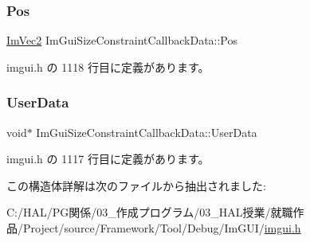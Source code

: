 \subsubsection{\texorpdfstring{Pos}{Pos}}
{\footnotesize\ttfamily \mbox{\hyperlink{struct_im_vec2}{Im\+Vec2}} Im\+Gui\+Size\+Constraint\+Callback\+Data\+::\+Pos}



 imgui.\+h の 1118 行目に定義があります。

\mbox{\label{struct_im_gui_size_constraint_callback_data_a3b2fb1bd849f82edc78377f361433eac}} 
\subsubsection{\texorpdfstring{User\+Data}{UserData}}
{\footnotesize\ttfamily void$\ast$ Im\+Gui\+Size\+Constraint\+Callback\+Data\+::\+User\+Data}



 imgui.\+h の 1117 行目に定義があります。



この構造体詳解は次のファイルから抽出されました\+:\begin{DoxyCompactItemize}
\item 
C\+:/\+H\+A\+L/\+P\+G関係/03\+\_\+作成プログラム/03\+\_\+\+H\+A\+L授業/就職作品/\+Project/source/\+Framework/\+Tool/\+Debug/\+Im\+G\+U\+I/\mbox{\hyperlink{imgui_8h}{imgui.\+h}}\end{DoxyCompactItemize}
